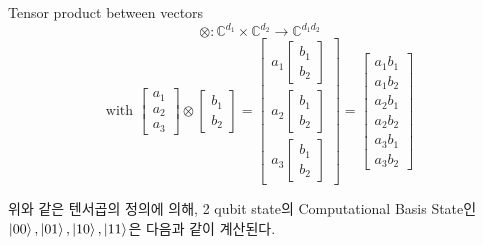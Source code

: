 \begin{definition}
Tensor product between vectors
    \[
        \otimes : \mathbb{C}^{d_1} \times \mathbb{C}^{d_2} \rightarrow \mathbb{C}^{d_1  d_2}
    \]
    \[
    \text{with }
    \begin{bmatrix}
        a_1 \\ a_2 \\ a_3
        \end{bmatrix}
        \otimes
        \begin{bmatrix}
        b_1 \\ b_2
        \end{bmatrix}
        =
        \begin{bmatrix}
        a_1\begin{bmatrix}
        b_1 \\ b_2
        \end{bmatrix}
         \\ a_2\begin{bmatrix}
        b_1 \\ b_2
        \end{bmatrix}
        \\ a_3\begin{bmatrix}
        b_1 \\ b_2
        \end{bmatrix}
        \end{bmatrix}
        =
        \begin{bmatrix}
        a_1b_1 \\ a_1b_2 \\ a_2b_1 \\ a_2b_2 \\ a_3b_1 \\ a_3b_2
        \end{bmatrix}
    \]
\end{definition}

위와 같은 텐서곱의 정의에 의해, 2 qubit state의 Computational Basis State인 \( \ket{00}, \ket{01}, \ket{10}, \ket{11}\)은 다음과 같이 계산된다.

